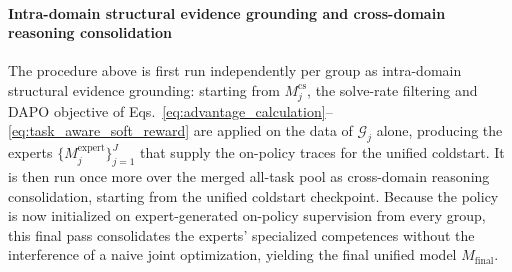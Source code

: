 \paragraph{Intra-domain structural evidence grounding and cross-domain reasoning consolidation} The procedure above is first run independently per group as intra-domain structural evidence grounding: starting from $M_j^{\text{cs}}$, the solve-rate filtering and DAPO objective of Eqs.~\eqref{eq:advantage_calculation}--\eqref{eq:task_aware_soft_reward} are applied on the data of $\mathcal{G}_j$ alone, producing the experts $\{M_j^{\text{expert}}\}_{j=1}^{J}$ that supply the on-policy traces for the unified coldstart. It is then run once more over the merged all-task pool as cross-domain reasoning consolidation, starting from the unified coldstart checkpoint. Because the policy is now initialized on expert-generated on-policy supervision from every group, this final pass consolidates the experts' specialized competences without the interference of a naive joint optimization, yielding the final unified model $M_{\text{final}}$.
